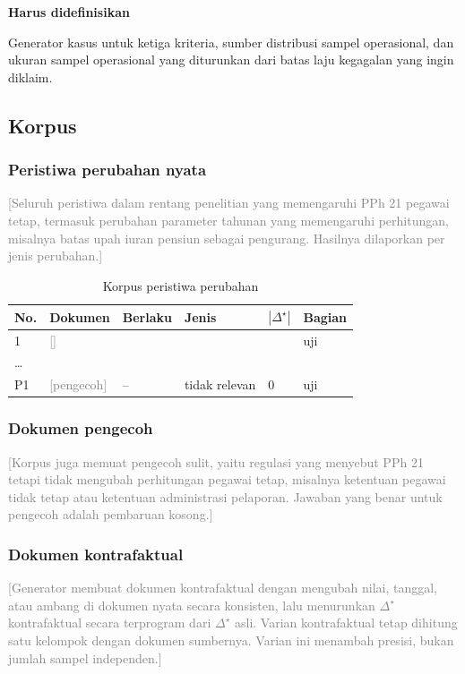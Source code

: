 \documentclass[journal,a4paper]{IEEEtran}
\newcommand{\emas}{\star}
\newif\ifrancangan \rancangantrue
\newcommand{\kotak}[3]{\ifrancangan\par\begingroup\scriptsize
  \def\FrameCommand{\fboxsep=3pt\fboxrule=0.4pt\fcolorbox{#1!60!black}{#1!6}}%
  \MakeFramed{\advance\hsize-\width\FrameRestore}\noindent\textbf{#2}\par #3\endMakeFramed\endgroup\fi}
\newcommand{\definisikan}[1]{\kotak{teal}{Harus didefinisikan}{#1}}
\newcommand{\isian}[1]{\ifrancangan\textcolor{gray}{[#1]}\fi}
\begin{document}
\definisikan{Generator kasus untuk ketiga kriteria, sumber distribusi sampel operasional, dan ukuran sampel operasional yang diturunkan dari batas laju kegagalan yang ingin diklaim.}

\subsection{Korpus}
\label{subsec:korpus}

\subsubsection{Peristiwa perubahan nyata}
\isian{Seluruh peristiwa dalam rentang penelitian yang memengaruhi PPh 21 pegawai tetap, termasuk perubahan parameter tahunan yang memengaruhi perhitungan, misalnya batas upah iuran pensiun sebagai pengurang. Hasilnya dilaporkan per jenis perubahan.}

\begin{table}[t]
\centering
\caption{Korpus peristiwa perubahan}
\label{tab:korpus}
\scriptsize
\begin{tabularx}{\columnwidth}{@{}P{0.5cm} L P{1.1cm} P{1.2cm} P{0.6cm} P{0.7cm}@{}}
\toprule
\textbf{No.} & \textbf{Dokumen} & \textbf{Berlaku} & \textbf{Jenis} & $|\Delta^{\emas}|$ & \textbf{Bagian} \\
 & \isian{} & & & & uji \\
\dots & & & & & \\
\midrule
P1 & \isian{pengecoh} & -- & tidak relevan & 0 & uji \\
\bottomrule
\end{tabularx}
\end{table}

\subsubsection{Dokumen pengecoh}
\isian{Korpus juga memuat pengecoh sulit, yaitu regulasi yang menyebut PPh 21 tetapi tidak mengubah perhitungan pegawai tetap, misalnya ketentuan pegawai tidak tetap atau ketentuan administrasi pelaporan. Jawaban yang benar untuk pengecoh adalah pembaruan kosong.}

\subsubsection{Dokumen kontrafaktual}
\isian{Generator membuat dokumen kontrafaktual dengan mengubah nilai, tanggal, atau ambang di dokumen nyata secara konsisten, lalu menurunkan $\Delta^{\emas}$ kontrafaktual secara terprogram dari $\Delta^{\emas}$ asli. Varian kontrafaktual tetap dihitung satu kelompok dengan dokumen sumbernya. Varian ini menambah presisi, bukan jumlah sampel independen.}
\end{document}
